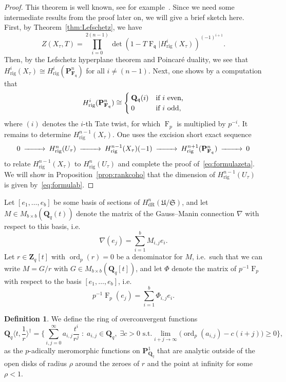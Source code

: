 \documentclass[a4paper,11pt]{article}
\numberwithin{equation}{section}
\newcommand{\ZZ}{\mathbf{Z}} %
\newcommand{\QQ}{\mathbf{Q}} %
\newcommand{\FF}{\mathbf{F}} %
\DeclareMathOperator{\ord}{ord}          %
\DeclareMathOperator{\Frob}{F}           %
\providecommand{\HdR}{H_{\text{dR}}}    %
\providecommand{\Hrig}{H_{\text{rig}}}  %
\theoremstyle{definition}
\newtheorem{defn}[thm]{Definition}
\begin{document}
\begin{proof}
This theorem is well known, see for example~\citep{AbbottKedlayaRoe2006}. 
Since we need some intermediate results from the proof later on, we will 
give a brief sketch here. First, by Theorem~\ref{thm:Lefschetz}, we have 
\[
Z(X_{\tau},T) = \prod_{i=0}^{2(n-1)} \det(1- T \Frob_{\mathfrak{q}} | \Hrig^i(X_{\tau}))^{(-1)^{i+1}}.
\]
Then, by the Lefschetz hyperplane theorem and Poincar\'e duality, we see 
that $\Hrig^i(X_{\tau}) \cong \Hrig^i(\mathbf{P}^n_{\FF_{\mathfrak{q}}})$ 
for all $i \neq (n-1)$. Next, one shows by a computation that
\begin{equation} \label{eqn:projcoho}
\Hrig^i(\mathbf{P}^n_{\FF_{\mathfrak{q}}}) 
\cong 
\begin{cases}
\QQ_{\mathfrak{q}}(i) &\mbox{if $i$ even,} \\
$0$ &\mbox{if $i$ odd,} 
\end{cases} 
\end{equation}
where $(i)$ denotes the $i$-th Tate twist, for which $\Frob_p$ is multiplied 
by $p^{-i}$. It remains to determine $\Hrig^{n-1}(X_{\tau})$. One uses the 
excision short exact sequence
\begin{equation} \label{eqn:excision}
\begin{CD}
0 @>>> \Hrig^{n}(U_{\tau}) @>>> \Hrig^{n-1}(X_{\tau})(-1) @>>> \Hrig^{n+1}(\mathbf{P}^n_{\FF_{\mathfrak{q}}}) @>>> 0
\end{CD} 
\end{equation}
to relate $\Hrig^{n-1}(X_{\tau})$ to $\Hrig^{n}(U_{\tau})$ and complete 
the proof of~\eqref{eq:formulazeta}. We will show in Proposition~\ref{prop:rankcoho}
that the dimension of $\Hrig^{n-1}(U_{\tau})$ is given by~\eqref{eq:formulab}.
\end{proof}

Let $[e_1, \dotsc, e_b]$ be some basis of sections of 
$\HdR^n(\mathfrak{U}/\mathfrak{S})$, and let $M \in M_{b \times b}(\QQ_q(t))$ 
denote the matrix of the Gauss--Manin connection $\nabla$ with respect 
to this basis, i.e.
\[
\nabla (e_j) = \sum_{i=1}^b M_{i,j} e_i.
\]
Let $r \in \ZZ_q[t]$ with $\ord_p(r)=0$ be a denominator for $M$, i.e.\ such that we can write 
$M = G/r$ with $G \in M_{b \times b}(\QQ_q[t])$, and let $\Phi$ denote the 
matrix of $p^{-1}\Frob_p$ with respect to the basis $[e_1, \dotsc, e_b]$, i.e.\
\[
p^{-1} \Frob_p (e_j) = \sum_{i=1}^b \Phi_{i,j} e_i.
\]

\begin{defn}
We define the ring of overconvergent functions
\[
\QQ_q \langle t, \frac{1}{r} \rangle^{\dag} = 
\biggl\{\sum_{i,j=0}^{\infty} a_{i,j} \frac{t^i}{r^j} \; : \; 
a_{i,j} \in \QQ_q, \; \exists c > 0 \text{ s.t.}  
\lim_{i+j \rightarrow \infty} \bigl(\ord_p(a_{i,j}) - c(i+j)\bigr) \geq 0
\biggr\},
\]
as the $p$-adically meromorphic functions on $\mathbf{P}^1_{\QQ_q}$ that are 
analytic outside of the open disks of radius $\rho$ around the zeroes of $r$ 
and the point at infinity for some $\rho<1$. 
\end{defn}
\end{document}
